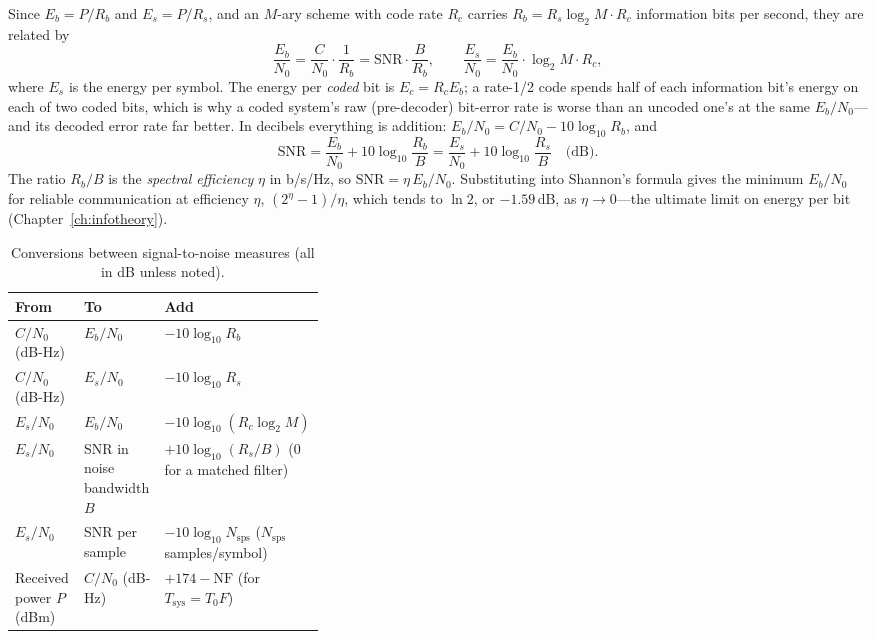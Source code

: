 Since $E_b=P/R_b$ and $E_s=P/R_s$, and an $M$-ary scheme with code rate $R_c$ carries
$R_b=R_s\log_2M\cdot R_c$ information bits per second, they are related by
\begin{equation}
\frac{E_b}{N_0}=\frac{C}{N_0}\cdot\frac{1}{R_b}=\mathrm{SNR}\cdot\frac{B}{R_b},
\qquad
\frac{E_s}{N_0}=\frac{E_b}{N_0}\cdot\log_2M\cdot R_c ,
\label{eq:ch03:ebno}
\end{equation}
where $E_s$ is the energy per symbol. The energy per \emph{coded} bit is $E_c=R_cE_b$; a rate-1/2 code
spends half of each information bit's energy on each of two coded bits, which is why a coded system's raw
(pre-decoder) bit-error rate is worse than an uncoded one's at the same $E_b/N_0$---and its decoded error
rate far better. In decibels everything is addition: $E_b/N_0=C/N_0-10\log_{10}R_b$, and
\begin{equation}
\mathrm{SNR}=\frac{E_b}{N_0}+10\log_{10}\frac{R_b}{B}=\frac{E_s}{N_0}+10\log_{10}\frac{R_s}{B}\quad\text{(dB)}.
\label{eq:ch03:snrdb}
\end{equation}
The ratio $R_b/B$ is the \emph{spectral efficiency} $\eta$ in b/s/Hz, so $\mathrm{SNR}=\eta\,E_b/N_0$.
Substituting into Shannon's formula gives the minimum $E_b/N_0$ for reliable communication at efficiency
$\eta$, $(2^\eta-1)/\eta$, which tends to $\ln2$, or $-1.59$\,dB, as $\eta\to0$---the ultimate limit on
energy per bit (Chapter~\ref{ch:infotheory}).

\begin{table}[htbp]\centering\small
\caption{Conversions between signal-to-noise measures (all in dB unless noted).}
\label{tab:ch03:conversions}
\begin{tabular}{@{}llp{0.36\linewidth}@{}}
\toprule
From & To & Add\\
\midrule
$C/N_0$ (dB-Hz) & $E_b/N_0$ & $-10\log_{10}R_b$\\
$C/N_0$ (dB-Hz) & $E_s/N_0$ & $-10\log_{10}R_s$\\
$E_s/N_0$ & $E_b/N_0$ & $-10\log_{10}(R_c\log_2M)$\\
$E_s/N_0$ & SNR in noise bandwidth $B$ & $+10\log_{10}(R_s/B)$ (0 for a matched filter)\\
$E_s/N_0$ & SNR per sample & $-10\log_{10}N_{\text{sps}}$ ($N_{\text{sps}}$ samples/symbol)\\
Received power $P$ (dBm) & $C/N_0$ (dB-Hz) & $+174-\mathrm{NF}$ (for $T_{\text{sys}}=T_0F$)\\
\bottomrule
\end{tabular}
\end{table}

